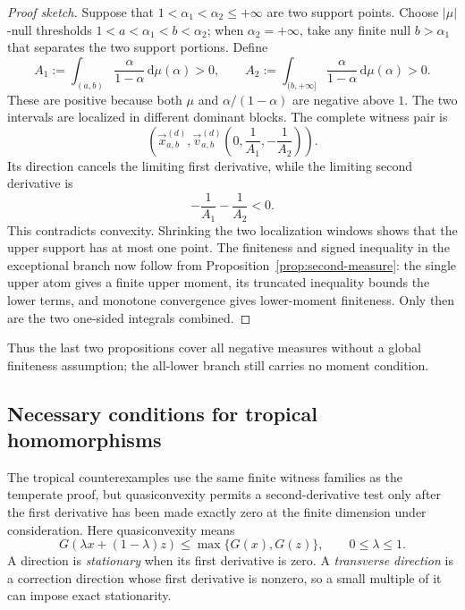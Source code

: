 \documentclass[aps,pra,11pt,onecolumn,nofootinbib,tightenlines]{revtex4-2}
\theoremstyle{definition}
\def \d {\mathrm{d}}
\begin{document}
\begin{proof}[Proof sketch]
Suppose that $1<\alpha_1<\alpha_2\leq+\infty$ are two support points.  Choose
$|\mu|$-null thresholds
$1<a<\alpha_1<b<\alpha_2$; when $\alpha_2=+\infty$, take any finite null
$b>\alpha_1$ that separates the two support portions.  Define
\[
A_1:=\int_{(a,b)}\frac{\alpha}{1-\alpha}\,\d\mu(\alpha)>0,
\qquad
A_2:=\int_{(b,+\infty]}\frac{\alpha}{1-\alpha}\,\d\mu(\alpha)>0.
\]
These are positive because both $\mu$ and $\alpha/(1-\alpha)$ are negative
above $1$.  The two intervals are localized in different dominant blocks.
The complete witness pair is
\begin{equation}
\left(
\vec{x}_{a,b}^{(d)},
\vec{v}_{a,b}^{(d)}\!\left(0,\frac1{A_1},-\frac1{A_2}\right)
\right).
\label{eq:negative-two-upper-witness-pair}
\end{equation}
Its direction cancels the limiting first derivative, while the
limiting second derivative is
\begin{equation}
-\frac1{A_1}-\frac1{A_2}<0.
\end{equation}
This contradicts convexity.  Shrinking the two localization windows shows that
the upper support has at most one point.  The finiteness and signed inequality in
the exceptional branch now follow from Proposition~\ref{prop:second-measure}:
the single upper atom gives a finite upper moment, its truncated inequality
bounds the lower terms, and monotone convergence gives lower-moment finiteness.
Only then are the two one-sided integrals combined.
\end{proof}

Thus the last two propositions cover all negative measures without a global
finiteness assumption; the all-lower branch still carries no moment condition.

\subsection{Necessary conditions for tropical homomorphisms}
\label{sec:necessary-tropical}

The tropical counterexamples use the same finite witness families as the
temperate proof, but quasiconvexity permits a second-derivative test only after
the first derivative has been made exactly zero at the finite dimension under
consideration.
Here quasiconvexity means
\[
G(\lambda x+(1-\lambda)z)
\leq\max\{G(x),G(z)\},
\qquad 0\leq\lambda\leq1.
\]
A direction is \emph{stationary} when its first derivative is zero.  A
\emph{transverse direction} is a correction direction whose first derivative
is nonzero, so a small multiple of it can impose exact stationarity.
\end{document}
